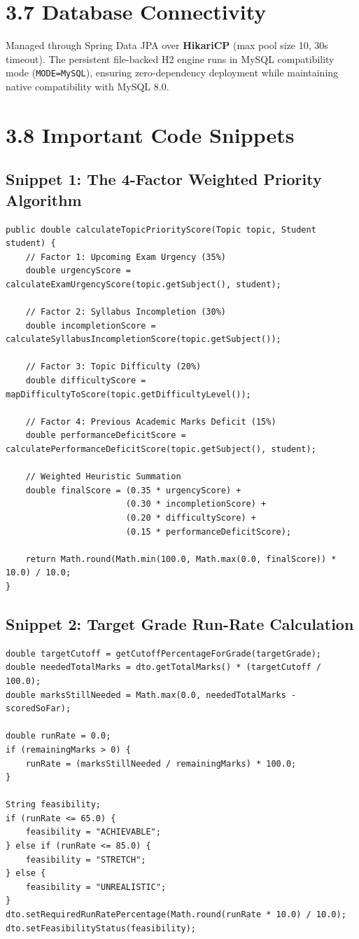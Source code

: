 \documentclass[12pt,a4paper]{report}
\begin{document}
\section{3.7 Database Connectivity}
Managed through Spring Data JPA over \textbf{HikariCP} (max pool size 10, 30s timeout). The persistent file-backed H2 engine runs in MySQL compatibility mode (\texttt{MODE=MySQL}), ensuring zero-dependency deployment while maintaining native compatibility with MySQL 8.0.

\section{3.8 Important Code Snippets}

\subsection{Snippet 1: The 4-Factor Weighted Priority Algorithm}
\begin{lstlisting}
public double calculateTopicPriorityScore(Topic topic, Student student) {
    // Factor 1: Upcoming Exam Urgency (35%)
    double urgencyScore = calculateExamUrgencyScore(topic.getSubject(), student);
    
    // Factor 2: Syllabus Incompletion (30%)
    double incompletionScore = calculateSyllabusIncompletionScore(topic.getSubject());
    
    // Factor 3: Topic Difficulty (20%)
    double difficultyScore = mapDifficultyToScore(topic.getDifficultyLevel());
    
    // Factor 4: Previous Academic Marks Deficit (15%)
    double performanceDeficitScore = calculatePerformanceDeficitScore(topic.getSubject(), student);
    
    // Weighted Heuristic Summation
    double finalScore = (0.35 * urgencyScore) +
                        (0.30 * incompletionScore) +
                        (0.20 * difficultyScore) +
                        (0.15 * performanceDeficitScore);
                        
    return Math.round(Math.min(100.0, Math.max(0.0, finalScore)) * 10.0) / 10.0;
}
\end{lstlisting}

\subsection{Snippet 2: Target Grade Run-Rate Calculation}
\begin{lstlisting}
double targetCutoff = getCutoffPercentageForGrade(targetGrade);
double neededTotalMarks = dto.getTotalMarks() * (targetCutoff / 100.0);
double marksStillNeeded = Math.max(0.0, neededTotalMarks - scoredSoFar);

double runRate = 0.0;
if (remainingMarks > 0) {
    runRate = (marksStillNeeded / remainingMarks) * 100.0;
}

String feasibility;
if (runRate <= 65.0) {
    feasibility = "ACHIEVABLE";
} else if (runRate <= 85.0) {
    feasibility = "STRETCH";
} else {
    feasibility = "UNREALISTIC";
}
dto.setRequiredRunRatePercentage(Math.round(runRate * 10.0) / 10.0);
dto.setFeasibilityStatus(feasibility);
\end{lstlisting}
\end{document}
